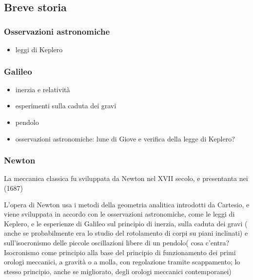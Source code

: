 \documentclass[letterpaper,10pt,italian]{jupyterBook}
\begin{document}
\subsection{Breve storia}
\label{\detokenize{ch/mechanics/intro-history:breve-storia}}

\subsubsection{Osservazioni astronomiche}
\label{\detokenize{ch/mechanics/intro-history:osservazioni-astronomiche}}\begin{itemize}
\item {} 
\sphinxAtStartPar
leggi di Keplero

\end{itemize}


\subsubsection{Galileo}
\label{\detokenize{ch/mechanics/intro-history:galileo}}\begin{itemize}
\item {} 
\sphinxAtStartPar
inerzia e relatività

\item {} 
\sphinxAtStartPar
esperimenti sulla caduta dei gravi

\item {} 
\sphinxAtStartPar
pendolo

\item {} 
\sphinxAtStartPar
osservazioni astronomiche: lune di Giove e verifica della legge di Keplero?

\end{itemize}


\subsubsection{Newton}
\label{\detokenize{ch/mechanics/intro-history:newton}}
\sphinxAtStartPar
La meccanica classica fu sviluppata da Newton nel XVII secolo, e presentanta nei  (1687)  

\sphinxAtStartPar
L’opera di Newton  usa i metodi della geometria analitica introdotti da Cartesio, e viene sviluppata in accordo con le osservazioni astronomiche, come le leggi di Keplero, e le esperienze di Galileo sul principio di inerzia, sulla caduta dei gravi ( anche se probabilmente era lo studio del rotolamento di corpi su piani inclinati) e sull’isocronismo delle piccole oscillazioni libere di un pendolo( cosa c’entra? Isocronismo come principio alla base del principio di funzionamento dei primi orologi meccanici, a gravità o a molla, con regolazione tramite scappamento; lo stesso principio, anche se migliorato, degli orologi meccanici contemporanei)
\end{document}
